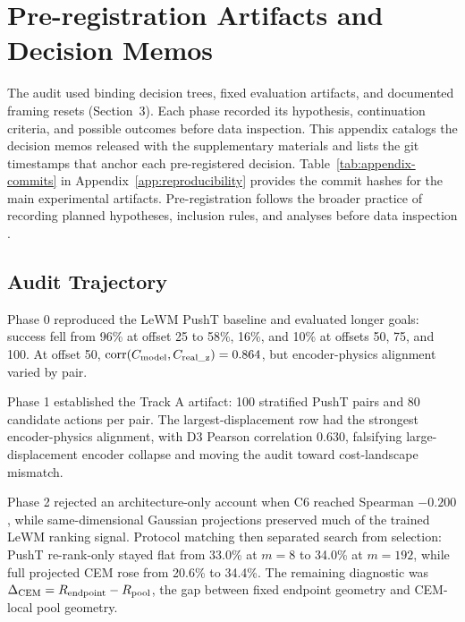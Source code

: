\section{Pre-registration Artifacts and Decision Memos}
\label{app:preregistration}

The audit used binding decision trees, fixed evaluation artifacts, and
documented framing resets (Section~3).  Each phase recorded its
hypothesis, continuation criteria, and possible outcomes before data
inspection.  This appendix catalogs the decision memos released with the
supplementary materials and lists the git timestamps that anchor each
pre-registered decision.  Table~\ref{tab:appendix-commits} in
Appendix~\ref{app:reproducibility} provides the commit hashes for the main
experimental artifacts.
Pre-registration follows the broader practice of recording planned hypotheses,
inclusion rules, and analyses before data inspection \citep{hofman2023preregistration}.

\subsection{Audit Trajectory}

Phase 0 reproduced the LeWM PushT baseline and evaluated longer goals:
success fell from 96\% at offset 25 to 58\%, 16\%, and 10\% at offsets 50,
75, and 100.  At offset 50,
$\mathrm{corr}(C_\text{model},C_\mathrm{real\_z})=0.864$, but
encoder-physics alignment varied by pair.

Phase 1 established the Track A artifact: 100 stratified PushT pairs and 80
candidate actions per pair.  The largest-displacement row had the strongest
encoder-physics alignment, with D3 Pearson correlation 0.630, falsifying
large-displacement encoder collapse and moving the audit toward
cost-landscape mismatch.

Phase 2 rejected an architecture-only account when C6 reached Spearman
$-0.200$, while same-dimensional Gaussian projections preserved much of the
trained LeWM ranking signal.  Protocol matching then separated search from
selection: PushT re-rank-only stayed flat from 33.0\% at $m=8$ to 34.0\%
at $m=192$, while full projected CEM rose from 20.6\% to 34.4\%.  The
remaining diagnostic was $\Delta_\text{CEM}=R_\text{endpoint}-R_\text{pool}$, the gap between
fixed endpoint geometry and CEM-local pool geometry.

